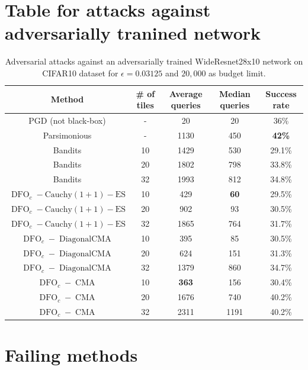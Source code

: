 \begin{subappendices}
\newpage


\section{Table for attacks against adversarially tranined network}
\begin{table}[htb]
\caption{Adversarial attacks against an adversarially trained WideResnet28x10 network on CIFAR10 dataset for $\epsilon=0.03125$ and $20,000$ as budget limit.}
\label{at_comp}
\begin{center}
\begin{tabular}{cc|cc|c}
\textbf{Method }& \textbf{\# of tiles} & \textbf{ Average queries} &\textbf{ Median queries} &\textbf{ Success rate}\\
 \hline
PGD (not black-box)& - & 20 &20& 36\% \\
\hline

Parsimonious&-&1130 & 450&\bf{42\%}\\
\hline
Bandits&10& 1429& {530} &29.1\%\\
 Bandits&20 &1802&798& 33.8\%\\
Bandits&32 &1993& 812& 34.8\%\\
\hline
$\operatorname{DFO}_c-\operatorname{Cauchy (1+1)-ES}$&10& 429& {\bf{60}} &29.5\%\\
$\operatorname{DFO}_c-\operatorname{Cauchy (1+1)-ES}$& 20&902 & 93  &30.5\%\\
$\operatorname{DFO}_c-\operatorname{Cauchy (1+1)-ES}$&32 &1865 &764 & 31.7\%\\
$\operatorname{DFO}_c-\operatorname{Diagonal CMA}$ &10&395 &85&30.5\%\\
$\operatorname{DFO}_c-\operatorname{Diagonal CMA}$&20 &624& 151& 31.3\% \\
$\operatorname{DFO}_c-\operatorname{Diagonal CMA}$& 32 &1379 &860& 34.7\%\\
$\operatorname{DFO}_c-\operatorname{CMA}$ &10& {\bf{363}} & 156&30.4\%\\
$\operatorname{DFO}_c-\operatorname{CMA}$&20 &1676&740& 40.2\% \\
$\operatorname{DFO}_c-\operatorname{CMA}$& 32 &2311 &1191& 40.2\%\\
\end{tabular}
\end{center}
\end{table}

\newpage


\section{Failing methods}


\end{subappendices}
